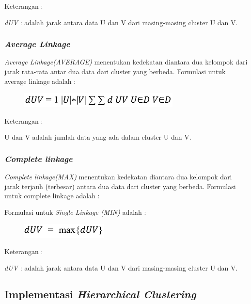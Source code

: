Keterangan : 
\par\textit{dUV} : adalah jarak antara data U dan V dari masing-masing cluster U dan V. 
\vspace{5cm}

\subsubsection{\textit{Average  Linkage}} 
\par
\par \textit{Average  Linkage(AVERAGE)} menentukan kedekatan diantara dua kelompok dari jarak rata-rata antar dua data dari cluster yang berbeda. 
Formulasi untuk average linkage adalah : 
\begin{figure} [htbp]
\centering
    \includegraphics[scale=0.8] {figures/Average.PNG}
    \label{fig:my_label}
\end{figure}

Keterangan : 
\par U dan V adalah jumlah data yang ada dalam cluster U dan V. 
\vspace{1cm}

\subsubsection{\textit{Complete linkage}} 
\par
\textit{Complete linkage(MAX)} menentukan kedekatan diantara dua kelompok dari jarak terjauh (terbesar) antara dua data dari cluster yang berbeda. Formulasi untuk complete linkage adalah : 

\par Formulasi untuk \textit{Single Linkage (MIN)} adalah :
\begin{figure} [htbp]
\centering
    \includegraphics[scale=0.8] {figures/Complete.PNG}
    \label{fig:my_label}
\end{figure}

Keterangan : 
\par\textit{dUV} : adalah jarak antara data U dan V dari masing-masing cluster U 
dan V. 

\subsection{Implementasi \textit{Hierarchical Clustering}}
